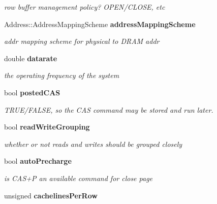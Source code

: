 \begin{DoxyCompactItemize}
\begin{DoxyCompactList}\small\item\em row buffer management policy? OPEN/CLOSE, etc \item\end{DoxyCompactList}\item 
Address::AddressMappingScheme {\bf addressMappingScheme}\label{class_d_r_a_msim_i_i_1_1_system_configuration_a989520b46acc6c3aa13f13f39c2e0bb2}

\begin{DoxyCompactList}\small\item\em addr mapping scheme for physical to DRAM addr \item\end{DoxyCompactList}\item 
double {\bf datarate}\label{class_d_r_a_msim_i_i_1_1_system_configuration_ad883c4bc92b6a4f3750d1fde61e6c3c7}

\begin{DoxyCompactList}\small\item\em the operating frequency of the system \item\end{DoxyCompactList}\item 
bool {\bf postedCAS}\label{class_d_r_a_msim_i_i_1_1_system_configuration_a9ca31c762ad14165cb6217a710b34ad8}

\begin{DoxyCompactList}\small\item\em TRUE/FALSE, so the CAS command may be stored and run later. \item\end{DoxyCompactList}\item 
bool {\bf readWriteGrouping}\label{class_d_r_a_msim_i_i_1_1_system_configuration_aa81278f33bba62be976d2cb202721645}

\begin{DoxyCompactList}\small\item\em whether or not reads and writes should be grouped closely \item\end{DoxyCompactList}\item 
bool {\bf autoPrecharge}\label{class_d_r_a_msim_i_i_1_1_system_configuration_a3dd04fddc806ef679c1c4bc8279eb043}

\begin{DoxyCompactList}\small\item\em is CAS+P an available command for close page \item\end{DoxyCompactList}\item 
unsigned {\bf cachelinesPerRow}\label{class_d_r_a_msim_i_i_1_1_system_configuration_ad6dd64e93af4a789af60a737c606c4e7}


\end{DoxyCompactItemize}
